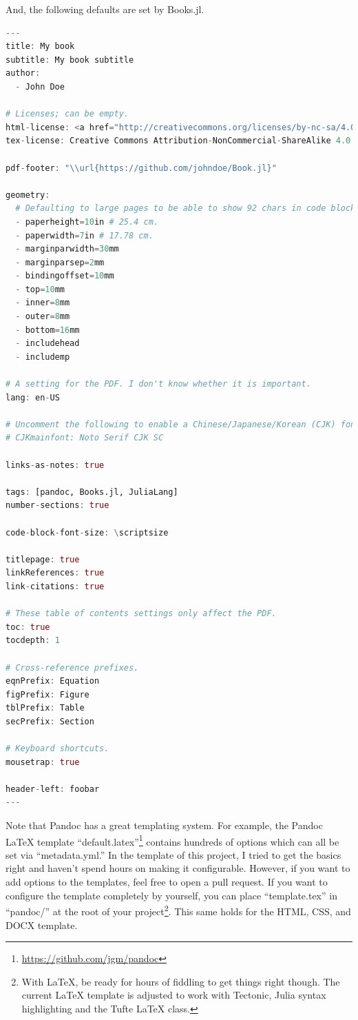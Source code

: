 \documentclass[
  notoc %
]{tufte-book}
\DeclareRobustCommand{\href}[2]{#2\footnote{\url{#1}}}
\begin{document}
And, the following defaults are set by Books.jl.

\begin{lstlisting}[language=Julia]
---
title: My book
subtitle: My book subtitle
author:
  - John Doe

# Licenses; can be empty.
html-license: <a href="http://creativecommons.org/licenses/by-nc-sa/4.0/">CC BY-NC-SA 4.0</a>
tex-license: Creative Commons Attribution-NonCommercial-ShareAlike 4.0 International

pdf-footer: "\\url{https://github.com/johndoe/Book.jl}"

geometry:
  # Defaulting to large pages to be able to show 92 chars in code blocks.
  - paperheight=10in # 25.4 cm.
  - paperwidth=7in # 17.78 cm.
  - marginparwidth=30mm
  - marginparsep=2mm
  - bindingoffset=10mm
  - top=10mm
  - inner=8mm
  - outer=8mm
  - bottom=16mm
  - includehead
  - includemp

# A setting for the PDF. I don't know whether it is important.
lang: en-US

# Uncomment the following to enable a Chinese/Japanese/Korean (CJK) font.
# CJKmainfont: Noto Serif CJK SC

links-as-notes: true

tags: [pandoc, Books.jl, JuliaLang]
number-sections: true

code-block-font-size: \scriptsize

titlepage: true
linkReferences: true
link-citations: true

# These table of contents settings only affect the PDF.
toc: true
tocdepth: 1

# Cross-reference prefixes.
eqnPrefix: Equation
figPrefix: Figure
tblPrefix: Table
secPrefix: Section

# Keyboard shortcuts.
mousetrap: true

header-left: foobar
---

\end{lstlisting}

Note that Pandoc has a great templating system. For example, the
\href{https://github.com/jgm/pandoc}{Pandoc LaTeX template
``default.latex''} contains hundreds of options which can all be set via
``metadata.yml.'' In the template of this project, I tried to get the
basics right and haven't spend hours on making it configurable. However,
if you want to add options to the templates, feel free to open a pull
request. If you want to configure the template completely by yourself,
you can place ``template.tex'' in ``pandoc/'' at the root of your
project\footnote{With LaTeX, be ready for hours of fiddling to get
  things right though. The current LaTeX template is adjusted to work
  with Tectonic, Julia syntax highlighting and the Tufte LaTeX class.}.
This same holds for the HTML, CSS, and DOCX template.
\end{document}
